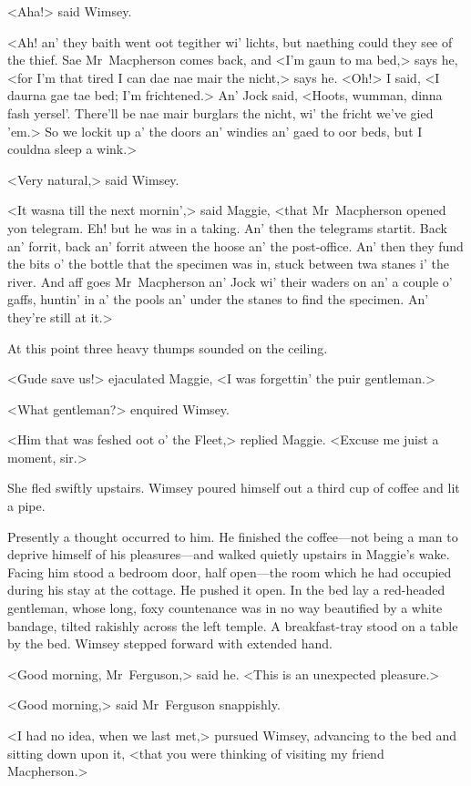 <Aha!> said Wimsey.

<Ah! an' they baith went oot tegither wi' lichts, but naething could they see of the thief. Sae Mr~Macpherson comes back, and <I'm gaun to ma bed,> says he, <for I'm that tired I can dae nae mair the nicht,> says he. <Oh!> I said, <I daurna gae tae bed; I'm frichtened.> An' Jock said, <Hoots, wumman, dinna fash yersel'. There'll be nae mair burglars the nicht, wi' the fricht we've gied 'em.> So we lockit up a' the doors an' windies an' gaed to oor beds, but I couldna sleep a wink.>

<Very natural,> said Wimsey.

<It wasna till the next mornin',> said Maggie, <that Mr~Macpherson opened yon telegram. Eh! but he was in a taking. An' then the telegrams startit. Back an' forrit, back an' forrit atween the hoose an' the post-office. An' then they fund the bits o' the bottle that the specimen was in, stuck between twa stanes i' the river. And aff goes Mr~Macpherson an' Jock wi' their waders on an' a couple o' gaffs, huntin' in a' the pools an' under the stanes to find the specimen. An' they're still at it.>

At this point three heavy thumps sounded on the ceiling.

<Gude save us!> ejaculated Maggie, <I was forgettin' the puir gentleman.>

<What gentleman?> enquired Wimsey.

<Him that was feshed oot o' the Fleet,> replied Maggie. <Excuse me juist a moment, sir.>

She fled swiftly upstairs. Wimsey poured himself out a third cup of coffee and lit a pipe.

Presently a thought occurred to him. He finished the coffee—not being a man to deprive himself of his pleasures—and walked quietly upstairs in Maggie's wake. Facing him stood a bedroom door, half open—the room which he had occupied during his stay at the cottage. He pushed it open. In the bed lay a red-headed gentleman, whose long, foxy countenance was in no way beautified by a white bandage, tilted rakishly across the left temple. A breakfast-tray stood on a table by the bed. Wimsey stepped forward with extended hand.

<Good morning, Mr~Ferguson,> said he. <This is an unexpected pleasure.>

<Good morning,> said Mr~Ferguson snappishly.

<I had no idea, when we last met,> pursued Wimsey, advancing to the bed and sitting down upon it, <that you were thinking of visiting my friend Macpherson.>


